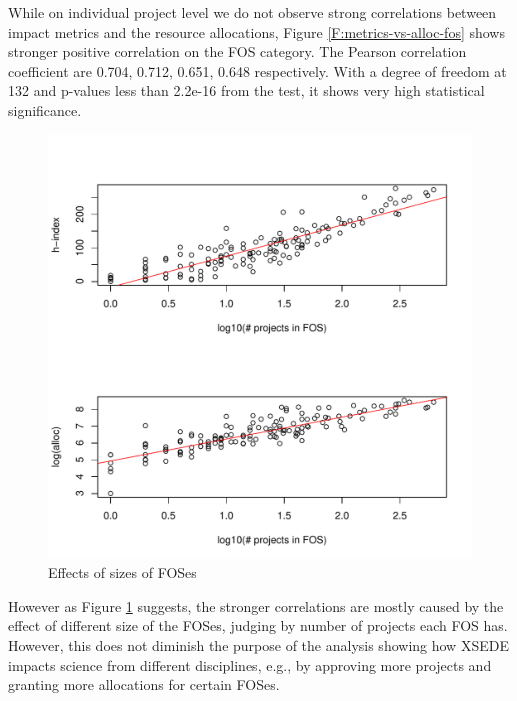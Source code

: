 \documentclass{sig-alternate}
\begin{document}
While on individual project level we do not observe strong correlations between impact metrics and the resource allocations, Figure \ref {F:metrics-vs-alloc-fos} shows stronger positive correlation on the FOS category. The Pearson correlation coefficient are 0.704, 0.712, 0.651, 0.648 respectively. With a degree of freedom at 132 and p-values less than 2.2e-16 from the test, it shows very high statistical significance.  
 
 
\begin{figure}[htb] 
  \centering 
    \includegraphics[width=1.0\columnwidth]{images/05_hindexalloc_vs_nprojects_fos_trended.pdf} 
  \caption{Effects of sizes of FOSes}\label{F:hindexalloc-vs-nprojects-fos-trended} 
\end{figure} 
 
However as Figure \ref{F:hindexalloc-vs-nprojects-fos-trended} suggests, the stronger correlations are mostly caused by the effect of different size of the FOSes, judging by number of projects each FOS has. However, this does not diminish the purpose of the analysis showing how XSEDE impacts science from different disciplines, e.g., by approving more projects and granting more allocations for certain FOSes. 
 
\end{document}
